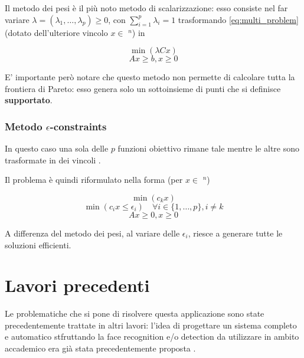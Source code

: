 Il metodo dei pesi è il più noto metodo di scalarizzazione: esso consiste nel far variare 
$\lambda = (\lambda_1, \dots, \lambda_p) \geq 0$, con $\sum_{i=1}^{p} \lambda_i = 1$ trasformando 
\ref{eq:multi_problem} (dotato dell'ulteriore vincolo $x \in$ \Zset$^n$) in 

\begin{equation*}
    \min (\lambda Cx)    
    \label{eq:}
\end{equation*}
\begin{equation*}
    Ax \geq b, x\geq 0
    \label{eq:}
\end{equation*}

E' importante però notare che questo metodo non permette di calcolare tutta la frontiera di Pareto:
esso genera solo un sottoinsieme di punti che si definisce \textbf{supportato}. 

\subsubsection{Metodo $\epsilon$-constraints}
\label{section:epsilon_constraints}

In questo caso una sola delle $p$ funzioni obiettivo rimane tale mentre le altre sono trasformate in 
dei vincoli \cite{Figueira2006}.

Il problema è quindi riformulato nella forma (per $x \in$ \Zset$^n$)

\begin{equation*}
    \min (c_kx)    
    \label{eq:}
\end{equation*}
\begin{equation*}
    \min (c_ix \leq \epsilon_i)  \quad \forall i \in \{1, \dots, p\}, i \neq k   
    \label{eq:}
\end{equation*}
\begin{equation*}
    Ax \geq 0, x \geq 0
    \label{eq:}
\end{equation*}

A differenza del metodo dei pesi, al variare delle $\epsilon_i$, riesce a generare tutte le soluzioni efficienti.

\newpage

\section{Lavori precedenti}
\label{section:past_works}

Le problematiche che si pone di risolvere questa applicazione sono state 
precedentemente trattate in altri lavori: l'idea di progettare un sistema 
completo e automatico stfruttando la face recognition e/o detection
da utilizzare in ambito accademico era già stata precedentemente proposta \cite{Kaw05}
\cite{Kotevski2018} \cite{Pat14} \cite{Sid16}.

